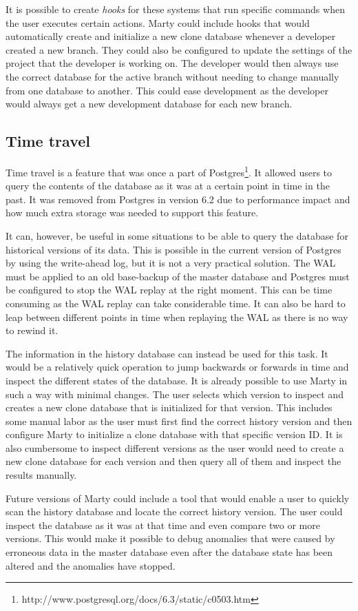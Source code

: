 It is possible to create \textit{hooks} for these systems that run specific commands when the user executes certain actions.
Marty could include hooks that would automatically create and initialize a new clone database whenever a developer created a new branch.
They could also be configured to update the settings of the project that the developer is working on.
The developer would then always use the correct database for the active branch without needing to change manually from one database to another.
This could ease development as the developer would always get a new development database for each new branch.

\subsection{Time travel}
Time travel is a feature that was once a part of Postgres\footnote{http://www.postgresql.org/docs/6.3/static/c0503.htm}.
It allowed users to query the contents of the database as it was at a certain point in time in the past.
It was removed from Postgres in version 6.2 due to performance impact and how much extra storage was needed to support this feature.

It can, however, be useful in some situations to be able to query the database for historical versions of its data.
This is possible in the current version of Postgres by using the write-ahead log, but it is not a very practical solution.
The WAL must be applied to an old base-backup of the master database and Postgres must be configured to stop the WAL replay at the right moment.
This can be time consuming as the WAL replay can take considerable time.
It can also be hard to leap between different points in time when replaying the WAL as there is no way to rewind it.

The information in the history database can instead be used for this task.
It would be a relatively quick operation to jump backwards or forwards in time and inspect the different states of the database.
It is already possible to use Marty in such a way with minimal changes.
The user selects which version to inspect and creates a new clone database that is initialized for that version.
This includes some manual labor as the user must first find the correct history version and then configure Marty to initialize a clone database with that specific version ID.
It is also cumbersome to inspect different versions as the user would need to create a new clone database for each version and then query all of them and inspect the results manually.

Future versions of Marty could include a tool that would enable a user to quickly scan the history database and locate the correct history version.
The user could inspect the database as it was at that time and even compare two or more versions.
This would make it possible to debug anomalies that were caused by erroneous data in the master database even after the database state has been altered and the anomalies have stopped.
